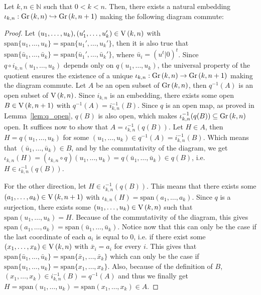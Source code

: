 \begin{proposition}\label{prop:gr_embedding} Let $k,n\in\mathbb{N}$ such that $0<k<n$. Then, there exists a natural embedding $\iota_{k,n}:\Gr{k}{n}\hookrightarrow\Gr{k}{n+1}$ making the following diagram commute:
\begin{center}
\end{center}
\end{proposition}
\begin{proof} Let $(u_1,\ldots,u_k),(u_1',\ldots,u_k')\in\St{k}{n}$ with $\mathrm{span}\{u_1,\ldots,u_k\}=\mathrm{span}\{u_1',\ldots,u_k'\}$, then it is also true that $\mathrm{span}\{\bar{u}_1,\ldots,\bar{u}_k\}=\mathrm{span}\{\bar{u}_1',\ldots,\bar{u}_k'\}$, where $\bar{u}_i=(u^t|0)^t$. Since $q\circ i_{k,n}(u_1,\ldots,u_k)$ depends only on $q(u_1,\ldots,u_k)$, the universal property of the quotient ensures the existence of a unique $\iota_{k,n}:\Gr{k}{n}\to\Gr{k}{n+1}$ making the diagram commute. Let $A$ be an open subset of $\Gr{k}{n}$, then $q^{-1}(A)$ is an open subset of $\St{k}{n}$. Since $i_{k,n}$ is an embedding, there exists some open $B\in\St{k}{n+1}$ with $q^{-1}(A)=i_{k,n}^{-1}(B)$. Since $q$ is an open map, as proved in Lemma~\ref{lem:q_open}, $q(B)$ is also open, which makes $\iota_{k,n}^{-1}(q(B))\subseteq\Gr{k}{n}$ open. It suffices now to show that $A=\iota_{k,n}^{-1}(q(B))$. Let $H\in A$, then $H=q(u_1,\ldots,u_k)$ for some $(u_1,\ldots,u_k)\in q^{-1}(A)=i_{k,n}^{-1}(B)$. Which means that $(\bar{u}_1,\ldots,\bar{u}_k)\in B$, and by the commutativity of the diagram, we get $\iota_{k,n}(H)=(\iota_{k,n}\circ q)(u_1,\ldots,u_k)=q(\bar{u}_1,\ldots,\bar{u}_k)\in q(B)$, i.e. $H\in\iota_{k,n}^{-1}(q(B))$.

For the other direction, let $H\in\iota_{k,n}^{-1}(q(B))$. This means that there exists some $(a_1,\ldots,a_k)\in\St{k}{n+1}$ with $\iota_{k,n}(H)=\mathrm{span}(a_1,\ldots,a_k)$. Since $q$ is a surjection, there exists some $(u_1,\ldots,u_k)\in\St{k}{n}$ such that $\mathrm{span}(u_1,\ldots,u_k)=H$. Because of the commutativity of the diagram, this gives $\mathrm{span}(a_1,\ldots,a_k)=\mathrm{span}(\bar{u}_1,\ldots,\bar{u}_k)$. Notice now that this can only be the case if the last coordinate of each $a_i$ is equal to $0$, i.e. if there exist some $(x_1,\ldots,x_k)\in\St{k}{n}$ with $\bar{x}_i=a_i$ for every $i$. This gives that $\mathrm{span}\{\bar{u}_1,\ldots,\bar{u}_k\}=\mathrm{span}\{\bar{x}_1,\ldots,\bar{x}_k\}$ which can only be the case if $\mathrm{span}\{u_1,\ldots,u_k\}=\mathrm{span}\{x_1,\ldots,x_k\}$. Also, because of the definition of $B$, $(x_1,\ldots,x_k)\in i_{k,n}^{-1}(B)=q^{-1}(A)$ and thus we finally get $H=\mathrm{span}(u_1,\ldots,u_k)=\mathrm{span}(x_1,\ldots,x_k)\in A$.
\end{proof}
